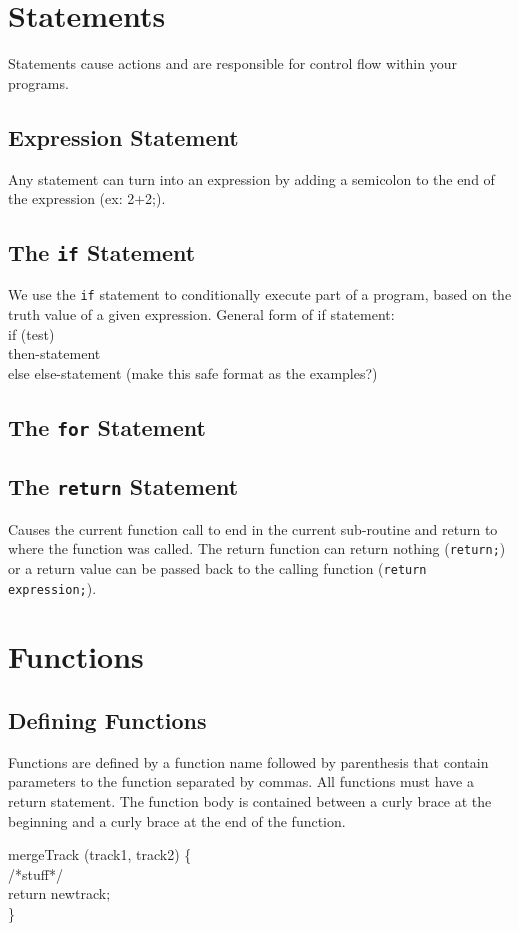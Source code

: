 \documentclass[letterpaper]{article}
\begin{document}
\section{Statements}
Statements cause actions and are responsible for control flow within your programs.
\subsection{Expression Statement}
Any statement can turn into an expression by adding a semicolon to the end of the expression (ex: 2+2;). 
\subsection{The \texttt{if} Statement}
We use the \texttt{if} statement to conditionally execute part of a program, based on the truth value of a given expression.
General form of if statement: \\
if (test) \\
then-statement \\
else
else-statement (make this safe format as the examples?)
\subsection{The \texttt{for} Statement}
\subsection{The \texttt{return} Statement}
Causes the current function call to end in the current sub-routine and return to where the function was called. The return function can return nothing (\texttt{return;}) or a return value can be passed back to the calling function (\texttt{return expression;}).
\section{Functions}
\subsection{Defining Functions}
Functions are defined by a function name followed by parenthesis that contain parameters to the function separated by commas. All functions must have a return statement. The function body is contained between a curly brace at the beginning and a curly brace at the end of the function.

mergeTrack (track1, track2) \{ \\
		/*stuff*/ \\
	return newtrack;\\
\}
\end{document}
